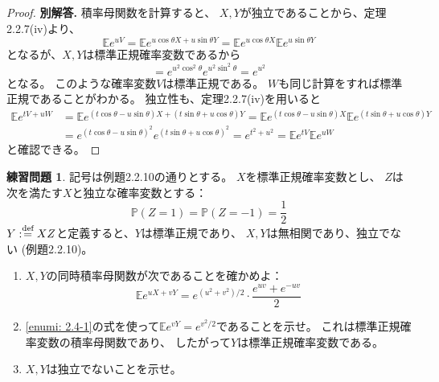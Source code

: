 \documentclass[uplatex]{jsarticle}
\theoremstyle{definition}
\newtheorem{prob}[prob]{練習問題}
\def\P{\mathbb{P}}
\def\E{\mathbb{E}}
\def\dfn{:\overset{\mbox{{\scriptsize def}}}{=}}
\begin{document}
\begin{proof}
  \textbf{別解答.}
  積率母関数を計算すると、
  \(X,Y\)が独立であることから、定理2.2.7(iv)より、
  \[
  \E e^{uV} = \E e^{u\cos\theta X + u\sin\theta Y}
  = \E e^{u\cos\theta X}  \E e^{u\sin\theta Y}
  \]
  となるが、\(X,Y\)は標準正規確率変数であるから
  \[
  = e^{u^2\cos^2\theta}e^{u^2\sin^2\theta} = e^{u^2}
  \]
  となる。
  このような確率変数\(V\)は標準正規である。
  \(W\)も同じ計算をすれば標準正規であることがわかる。
  独立性も、定理2.2.7(iv)を用いると
  \begin{align*}
    \E e^{tV+uW}
    &= \E e^{(t\cos\theta-u\sin\theta)X + (t\sin\theta+u\cos\theta)Y}
    = \E e^{(t\cos\theta-u\sin\theta)X} \E e^{(t\sin\theta+u\cos\theta)Y} \\
    &= e^{(t\cos\theta-u\sin\theta)^2}e^{(t\sin\theta+u\cos\theta)^2}
    = e^{t^2+u^2}
    = \E e^{tV} \E e^{uW}
  \end{align*}
  と確認できる。
\end{proof}





\begin{prob}\label{prob: 2.4}
  記号は例題2.2.10の通りとする。
  \(X\)を標準正規確率変数とし、
  \(Z\)は次を満たす\(X\)と独立な確率変数とする：
  \[
  \P(Z=1) = \P(Z=-1) = \frac{1}{2}
  \]
  \(Y\dfn XZ\)と定義すると、\(Y\)は標準正規であり、
  \(X,Y\)は無相関であり、独立でない (例題2.2.10)。
  \begin{enumerate}
    \item \label{enumi: 2.4-1}
    \(X,Y\)の同時積率母関数が次であることを確かめよ：
    \[
    \E e^{uX+vY} = e^{(u^2+v^2)/2}\cdot \frac{e^{uv}+e^{-uv}}{2}
    \]
    \item \label{enumi: 2.4-2}
    \ref{enumi: 2.4-1}の式を使って\(\E e^{vY}=e^{v^2/2}\)であることを示せ。
    これは標準正規確率変数の積率母関数であり、
    したがって\(Y\)は標準正規確率変数である。
    \item \label{enumi: 2.4-3}
    \(X,Y\)は独立でないことを示せ。
  \end{enumerate}
\end{prob}
\end{document}
